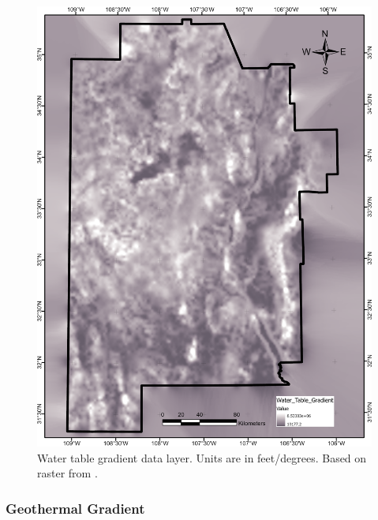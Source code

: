 \begin{figure}[!htp]
\centering
\includegraphics[scale=.50]{templates/images/Figure-WTGradient.png}
\caption[Water table gradient data layer]{Water table gradient data layer. Units are in feet/degrees. Based on raster from \protect\citep{bielicki_hydrogeolgic_2015}.}
\label{fig:feat_wt_gradient}
\end{figure}

\subsubsection{Geothermal Gradient}

